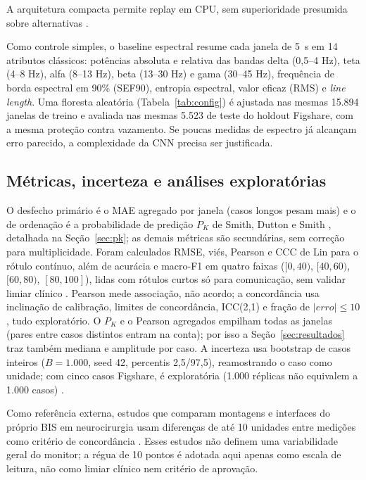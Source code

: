 \documentclass[12pt]{article}
\begin{document}
A arquitetura compacta permite replay em CPU, sem superioridade presumida sobre alternativas \cite{park2020,shi2023}.

Como controle simples, o baseline espectral resume cada janela de 5~s em 14 atributos clássicos: potências absoluta e relativa das bandas delta (0,5--4 Hz), teta (4--8 Hz), alfa (8--13 Hz), beta (13--30 Hz) e gama (30--45 Hz), frequência de borda espectral em 90\% (SEF90), entropia espectral, valor eficaz (RMS) e \textit{line length}. Uma floresta aleatória (Tabela~\ref{tab:config}) é ajustada nas mesmas 15.894 janelas de treino e avaliada nas mesmas 5.523 de teste do holdout Figshare, com a mesma proteção contra vazamento. Se poucas medidas de espectro já alcançam erro parecido, a complexidade da CNN precisa ser justificada.

\subsection{Métricas, incerteza e análises exploratórias}

O desfecho primário é o MAE agregado por janela (casos longos pesam mais) e o de ordenação é a probabilidade de predição $P_K$ de Smith, Dutton e Smith \cite{smith1996}, detalhada na Seção~\ref{sec:pk}; as demais métricas são secundárias, sem correção para multiplicidade. Foram calculados RMSE, viés, Pearson e CCC de Lin para o rótulo contínuo, além de acurácia e macro-F1 em quatro faixas ($[0,40)$, $[40,60)$, $[60,80)$, $[80,100]$), lidas com rótulos curtos só para comunicação, sem validar limiar clínico \cite{tripodai}. Pearson mede associação, não acordo; a concordância usa inclinação de calibração, limites de concordância, ICC(2,1) e fração de $|erro|\leq10$, tudo exploratório. O $P_K$ e o Pearson agregados empilham todas as janelas (pares entre casos distintos entram na conta); por isso a Seção~\ref{sec:resultados} traz também mediana e amplitude por caso. A incerteza usa bootstrap de casos inteiros ($B=1.000$, seed 42, percentis 2,5/97,5), reamostrando o caso como unidade; com cinco casos Figshare, é exploratória (1.000 réplicas não equivalem a 1.000 casos) \cite{field2007,archer2021}.

Como referência externa, estudos que comparam montagens e interfaces do próprio BIS em neurocirurgia usam diferenças de até 10 unidades entre medições como critério de concordância \cite{dahaba2010,shiraishi2004,harada2021}. Esses estudos não definem uma variabilidade geral do monitor; a régua de 10 pontos é adotada aqui apenas como escala de leitura, não como limiar clínico nem critério de aprovação.
\end{document}
